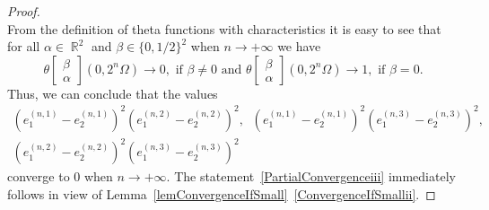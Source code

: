 \documentclass{amsart}
\numberwithin{equation}{section}
\theoremstyle{definition}
\theoremstyle{remark}
\DeclareMathOperator{\RR}{\mathbb R}
\begin{document}
\begin{proof}
\[		\]
		From the definition of theta functions with characteristics it is easy to see that for all $\alpha \in \RR^2$ and  $\beta \in \{0, 1/2\}^2$ when $n \to +\infty$ we have
		\[
		\theta\begin{bmatrix} \beta \\ \alpha \end{bmatrix}(0,2^n\Omega) \to 0,\text{ if }\beta \ne 0 \text{ and }\theta\begin{bmatrix} \beta \\ \alpha \end{bmatrix}(0,2^n\Omega) \to 1,\text{ if }\beta = 0. 
		\]
		Thus, we can conclude that the values 
		\[
		\begin{gathered}
			\left(e_1^{(n,1)} - e_2^{(n,1)}\right)^2\left(e_1^{(n,2)} - e_2^{(n,2)}\right)^2,\;\;\left(e_1^{(n,1)} - e_2^{(n,1)}\right)^2\left(e_1^{(n,3)} - e_2^{(n,3)}\right)^2,\\ \left(e_1^{(n,2)} - e_2^{(n,2)}\right)^2\left(e_1^{(n,3)} - e_2^{(n,3)}\right)^2
		\end{gathered}
		\]
		converge to $0$ when $n \to +\infty$. The statement~\ref{PartialConvergenceiii} immediately follows in view of Lemma~\ref{lemConvergenceIfSmall}~\ref{ConvergenceIfSmallii}.
	\end{proof}
\end{document}
